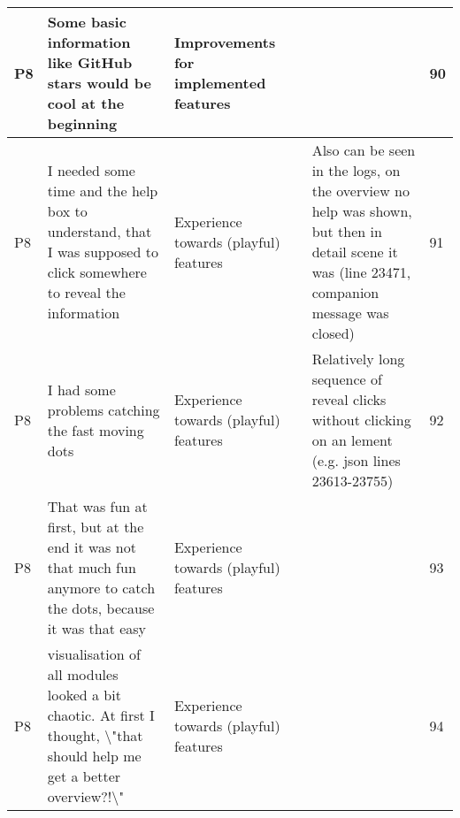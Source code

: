 \begin{appendices}
\begin{landscape}
\begin{longtable}{|p{0.8cm}|p{7cm}|p{3cm}|p{3cm}|p{5.5cm}|p{0.5cm}|}
      P8                   & Some basic information like GitHub stars would be cool at the beginning                                                                                                                                                                                                     & Improvements for implemented features    &                                    &                                                                                                                                                    & 90           \\ \hline
      P8                   & I needed some time and the help box to understand, that I was supposed to click somewhere to reveal the information                                                                                                                                                         & Experience towards (playful) features    &                                    & Also can be seen in the logs, on the overview no help was shown, but then in detail scene it was (line 23471, companion message was closed)        & 91           \\ \hline
      P8                   & I had some problems catching the fast moving dots                                                                                                                                                                                                                           & Experience towards (playful) features    &                                    & Relatively long sequence of reveal clicks without clicking on an lement (e.g. json lines 23613-23755)                                              & 92           \\ \hline
      P8                   & That was fun at first, but at the end it was not that much fun anymore to catch the dots, because it was that easy                                                                                                                                                          & Experience towards (playful) features    &                                    &                                                                                                                                                    & 93           \\ \hline
      P8                   & visualisation of all modules looked a bit chaotic. At first I thought, \textbackslash{}"that should help me get a better overview?!\textbackslash{}"                                                                                                                        & Experience towards (playful) features    &                                    &                                                                                                                                                    & 94           \\ \hline

\end{longtable}
\end{landscape}
\end{appendices}
